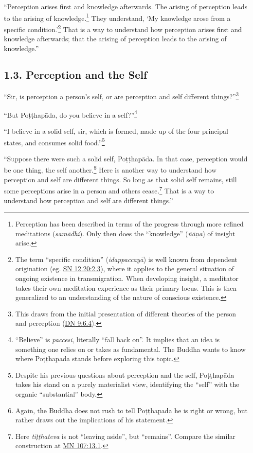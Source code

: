 \documentclass[12pt,openany]{book}%
\begin{document}
“Perception arises first and knowledge afterwards. The arising of perception leads to the arising of knowledge.\footnote{Perception has been described in terms of the progress through more refined meditations (\textit{\textsanskrit{samādhi}}). Only then does the “knowledge” (\textit{\textsanskrit{ñāṇa}}) of insight arise. } They understand, ‘My knowledge arose from a specific condition.’\footnote{The term “specific condition” (\textit{\textsanskrit{idappaccayā}}) is well known from dependent origination (eg. \href{https://suttacentral.net/sn12.20/en/sujato\#2.3}{SN 12.20:2.3}), where it applies to the general situation of ongoing existence in transmigration. When developing insight, a meditator takes their own meditation experience as their primary locus. This is then generalized to an understanding of the nature of conscious existence. } That is a way to understand how perception arises first and knowledge afterwards; that the arising of perception leads to the arising of knowledge.” 

\subsection*{1.3. Perception and the Self }

“Sir, is perception a person’s self, or are perception and self different things?”\footnote{This draws from the initial presentation of different theories of the person and perception (\href{https://suttacentral.net/dn9/en/sujato\#6.4}{DN 9:6.4}). } 

“But \textsanskrit{Poṭṭhapāda}, do you believe in a self?”\footnote{“Believe” is \textit{paccesi}, literally “fall back on”. It implies that an idea is something one relies on or takes as fundamental. The Buddha wants to know where \textsanskrit{Poṭṭhapāda} stands before exploring this topic. } 

“I believe in a solid self, sir, which is formed, made up of the four principal states, and consumes solid food.”\footnote{Despite his previous questions about perception and the self, \textsanskrit{Poṭṭhapāda} takes his stand on a purely materialist view, identifying the “self” with the organic “substantial” body. } 

“Suppose there were such a solid self, \textsanskrit{Poṭṭhapāda}. In that case, perception would be one thing, the self another.\footnote{Again, the Buddha does not rush to tell \textsanskrit{Poṭṭhapāda} he is right or wrong, but rather draws out the implications of his statement. } Here is another way to understand how perception and self are different things. So long as that solid self remains, still some perceptions arise in a person and others cease.\footnote{Here \textit{\textsanskrit{tiṭṭhateva}} is not “leaving aside”, but “remains”. Compare the similar construction at \href{https://suttacentral.net/mn107/en/sujato\#13.1}{MN 107:13.1}. } That is a way to understand how perception and self are different things.” 
\end{document}
